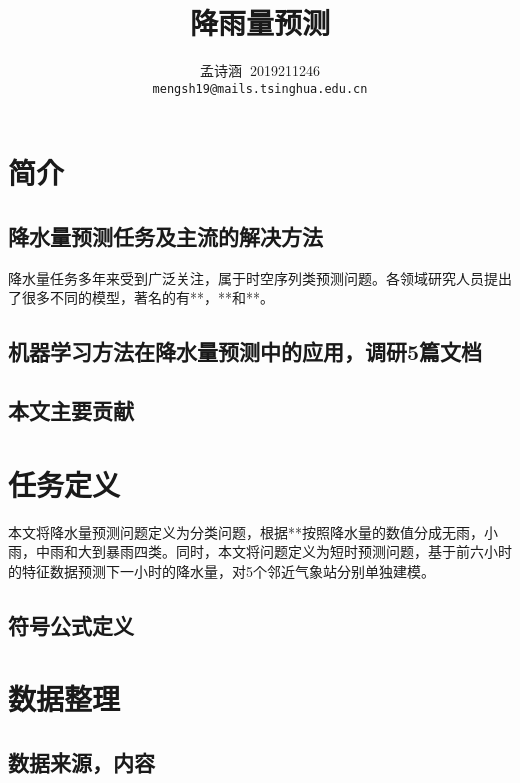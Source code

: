 \documentclass[UTF8]{ctexart}
\title{降雨量预测} %
\author{孟诗涵$\;\;$2019211246\\ \texttt{mengsh19@mails.tsinghua.edu.cn}} %
\date{} %
\begin{document}
\normalsize

\maketitle %
\setlength{\baselineskip}{18pt}

\section{简介}
\subsection{降水量预测任务及主流的解决方法}
降水量任务多年来受到广泛关注，属于时空序列类预测问题。各领域研究人员提出了很多不同的模型，著名的有**，**和**。

\subsection{机器学习方法在降水量预测中的应用，调研5篇文档}

\subsection{本文主要贡献}

\section{任务定义}
本文将降水量预测问题定义为分类问题，根据**按照降水量的数值分成无雨，小雨，中雨和大到暴雨四类。同时，本文将问题定义为短时预测问题，基于前六小时的特征数据预测下一小时的降水量，对5个邻近气象站分别单独建模。

\subsection{符号公式定义}

\section{数据整理}

\subsection{数据来源，内容}
\end{document}
